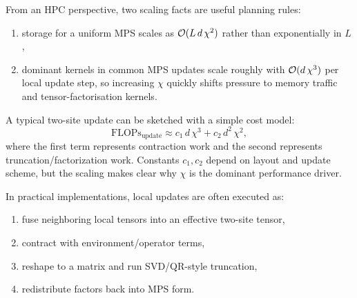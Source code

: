 From an HPC perspective, two scaling facts are useful planning rules:
\begin{enumerate}
  \item storage for a uniform MPS scales as $\mathcal{O}(L\,d\,\chi^2)$ rather than
    exponentially in $L$,
  \item dominant kernels in common MPS updates scale roughly with
    $\mathcal{O}(d\,\chi^3)$ per local update step, so increasing $\chi$ quickly
    shifts pressure to memory traffic and tensor-factorisation kernels.
\end{enumerate}

A typical two-site update can be sketched with a simple cost model:
\[
  \text{FLOPs}_{\text{update}}
  \approx c_1\,d\,\chi^3 + c_2\,d^2\,\chi^2,
\]
where the first term represents contraction work and the second represents
truncation/factorization work. Constants $c_1,c_2$ depend on layout and update
scheme, but the scaling makes clear why $\chi$ is the dominant performance
driver.

In practical implementations, local updates are often executed as:
\begin{enumerate}
  \item fuse neighboring local tensors into an effective two-site tensor,
  \item contract with environment/operator terms,
  \item reshape to a matrix and run SVD/QR-style truncation,
  \item redistribute factors back into MPS form.
\end{enumerate}

